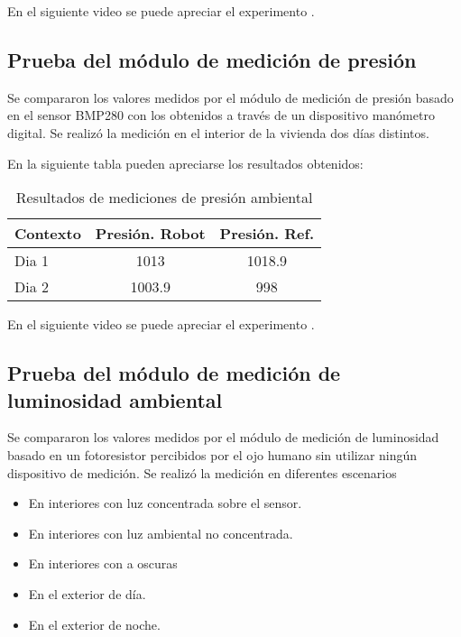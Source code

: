 En el siguiente video se puede apreciar el experimento \cite{Video_Prueba_TempHum}.

\subsection{Prueba del módulo de medición de presión}

Se compararon los valores medidos por el módulo de medición de presión basado en el sensor BMP280 con los obtenidos a través de un dispositivo manómetro digital. Se realizó la medición en el interior de la vivienda dos días distintos.

En la siguiente tabla pueden apreciarse los resultados obtenidos:

\begin{table}[h]
\centering
\caption[Resultados de mediciones de presión ambiental]{Resultados de mediciones de presión ambiental}
\begin{tabular}{l c c}
\toprule
\textbf{Contexto} & \textbf{Presión. Robot} & \textbf{Presión. Ref.} \\
\midrule
Dia 1 & 1013 & 1018.9 \\
Dia 2 & 1003.9 & 998 \\
\bottomrule
\hline
\end{tabular}
\end{table}

En el siguiente video se puede apreciar el experimento \cite{Video_Prueba_Presion}.

\subsection{Prueba del módulo de medición de luminosidad ambiental}

Se compararon los valores medidos por el módulo de medición de luminosidad basado en un fotoresistor percibidos por el ojo humano sin utilizar ningún dispositivo de medición. Se realizó la medición en diferentes escenarios

\begin{itemize}
	\item En interiores con luz concentrada sobre el sensor.
	\item En interiores con luz ambiental no concentrada.
	\item En interiores con a oscuras
	\item En el exterior de día.
	\item En el exterior de noche.
\end{itemize}

